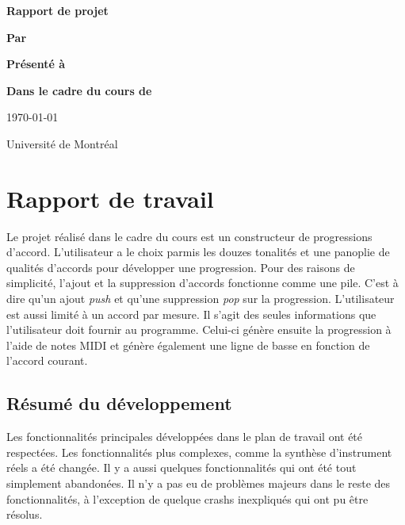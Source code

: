 \documentclass[letterpaper,12pt]{scrartcl}
\begin{document}
	\begin{center}
		\vspace{2cm}

		{\Huge\bf\sf Rapport de projet}
		\vspace{4cm}

		{\bf\sf Par}

		\vspace{0.5cm}{\large\bf\sf François Poitras}

		\vspace{2cm}

		{\bf\sf Présenté à}

		\vspace{0.5cm}{\large\bf\sf Olivier Bélanger}

		\vspace{2cm}

		{\bf\sf Dans le cadre du cours de}

		\vspace{0.5cm}{\large\bf\sf Création Musicale en Language Python 2 (MUS3327)}

		\vspace{\fill}
		
		\today

		\vspace{0.5cm}
		Université de Montréal
	\end{center}

	\newpage
	
	\section{Rapport de travail}
	Le projet réalisé dans le cadre du cours est un constructeur de progressions d'accord. L'utilisateur a le choix parmis les douzes tonalités et une panoplie de qualités d'accords pour développer une progression. Pour des raisons de simplicité, l'ajout et la suppression d'accords fonctionne comme une pile. C'est à dire qu'un ajout \textit{push} et qu'une suppression \textit{pop} sur la progression. L'utilisateur est aussi limité à un accord par mesure. Il s'agit des seules informations que l'utilisateur doit fournir au programme. Celui-ci génère ensuite la progression à l'aide de notes MIDI et génère également une ligne de basse en fonction de l'accord courant.
	
	\subsection{Résumé du développement}
	Les fonctionnalités principales développées dans le plan de travail ont été respectées. Les fonctionnalités plus complexes, comme la synthèse d'instrument réels a été changée. Il y a aussi quelques fonctionnalités qui ont été tout simplement abandonées. Il n'y a pas eu de problèmes majeurs dans le reste des fonctionnalités, à l'exception de quelque crashs inexpliqués qui ont pu être résolus.
\end{document}
